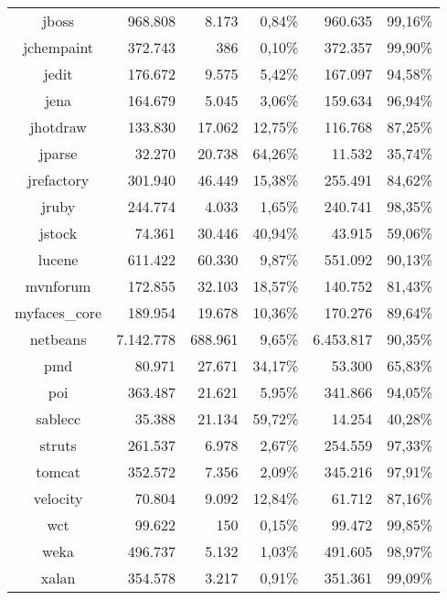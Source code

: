 \begin{table}
\begin{tabularx}{\textwidth}{c|r|r|r|r|r}
		jboss & 968.808 & 8.173 & 0,84\% & 960.635 & 99,16\% \\
		jchempaint & 372.743 & 386 & 0,10\% & 372.357 & 99,90\% \\
		jedit & 176.672 & 9.575 & 5,42\% & 167.097 & 94,58\% \\
		jena & 164.679 & 5.045 & 3,06\% & 159.634 & 96,94\% \\
		jhotdraw & 133.830 & 17.062 & 12,75\% & 116.768 & 87,25\% \\
		jparse & 32.270 & 20.738 & 64,26\% & 11.532 & 35,74\% \\
		jrefactory & 301.940 & 46.449 & 15,38\% & 255.491 & 84,62\% \\
		jruby & 244.774 & 4.033 & 1,65\% & 240.741 & 98,35\% \\
		jstock & 74.361 & 30.446 & 40,94\% & 43.915 & 59,06\% \\
		lucene & 611.422 & 60.330 & 9,87\% & 551.092 & 90,13\% \\
		mvnforum & 172.855 & 32.103 & 18,57\% & 140.752 & 81,43\% \\
		myfaces\_core & 189.954 & 19.678 & 10,36\% & 170.276 & 89,64\% \\
		netbeans & 7.142.778 & 688.961 & 9,65\% & 6.453.817 & 90,35\% \\
		pmd & 80.971 & 27.671 & 34,17\% & 53.300 & 65,83\% \\
		poi & 363.487 & 21.621 & 5,95\% & 341.866 & 94,05\% \\
		sablecc & 35.388 & 21.134 & 59,72\% & 14.254 & 40,28\% \\
		struts & 261.537 & 6.978 & 2,67\% & 254.559 & 97,33\% \\
		tomcat & 352.572 & 7.356 & 2,09\% & 345.216 & 97,91\% \\
		velocity & 70.804 & 9.092 & 12,84\% & 61.712 & 87,16\% \\
		wct & 99.622 & 150 & 0,15\% & 99.472 & 99,85\% \\
		weka & 496.737 & 5.132 & 1,03\% & 491.605 & 98,97\% \\
		xalan & 354.578 & 3.217 & 0,91\% & 351.361 & 99,09\% \\
	\end{tabularx}
\end{table}
\setlength{\extrarowheight}{0em}